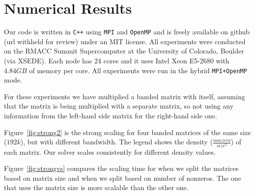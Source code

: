 \section{Numerical Results}
\label{sec:results}

Our code is written in \texttt{C++} using \texttt{MPI} and \texttt{OpenMP} and is freely available on github (url withheld for review) under an MIT license. 
All experiments were conducted on the RMACC Summit Supercomputer at the University of Colorado, Boulder (via XSEDE). Each node has 24 cores and it uses Intel Xeon E5-2680 with $4.84GB$ of memory per core. All experiments were run in the hybrid \texttt{MPI+OpenMP} mode. 


For these experiments we have multiplied a banded matrix with itself, assuming that the matrix is being multiplied with a separate matrix, so not using any information from the left-hand side matrix for the right-hand side one.

Figure~\ref{fig:strong2} is the strong scaling for four banded matrices of the same size ($192k$), but with different bandwidth. The legend shows the density ($\frac{nonzero}{size^2}$) of each matrix. Our solver scales consistently for different density values.

Figure~\ref{fig:strongvs} compares the scaling time for when we split the matrices based on matrix size and when we split based on number of nonzeros. The one that uses the matrix size is more scalable than the other one.

